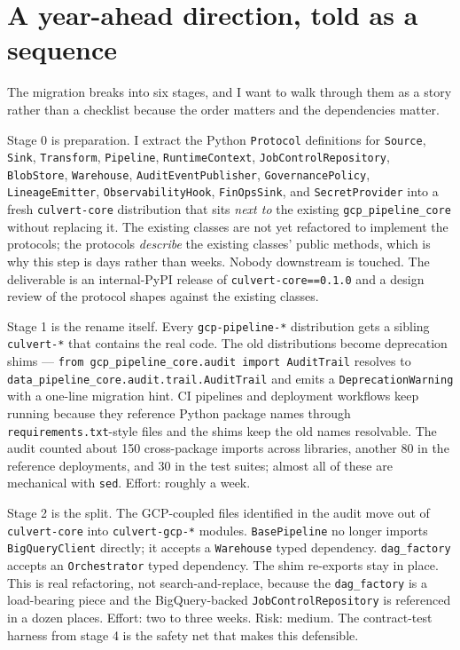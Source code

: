 \documentclass[
  11pt,
  british,
  oneside]{book}
\begin{document}
\hypertarget{a-year-ahead-direction-told-as-a-sequence}{%
\section{A year-ahead direction, told as a
sequence}\label{a-year-ahead-direction-told-as-a-sequence}}

The migration breaks into six stages, and I want to walk through them as
a story rather than a checklist because the order matters and the
dependencies matter.

Stage 0 is preparation. I extract the Python \texttt{Protocol}
definitions for \texttt{Source}, \texttt{Sink}, \texttt{Transform},
\texttt{Pipeline}, \texttt{RuntimeContext},
\texttt{JobControlRepository}, \texttt{BlobStore}, \texttt{Warehouse},
\texttt{AuditEventPublisher}, \texttt{GovernancePolicy},
\texttt{LineageEmitter}, \texttt{ObservabilityHook},
\texttt{FinOpsSink}, and \texttt{SecretProvider} into a fresh
\texttt{culvert-core} distribution that sits \emph{next to} the existing
\texttt{gcp\_pipeline\_core} without replacing it. The existing classes
are not yet refactored to implement the protocols; the protocols
\emph{describe} the existing classes' public methods, which is why this
step is days rather than weeks. Nobody downstream is touched. The
deliverable is an internal-PyPI release of \texttt{culvert-core==0.1.0}
and a design review of the protocol shapes against the existing classes.

Stage 1 is the rename itself. Every \texttt{gcp-pipeline-*} distribution
gets a sibling \texttt{culvert-*} that contains the real code. The old
distributions become deprecation shims ---
\texttt{from\ gcp\_pipeline\_core.audit\ import\ AuditTrail} resolves to
\texttt{data\_pipeline\_core.audit.trail.AuditTrail} and emits a
\texttt{DeprecationWarning} with a one-line migration hint. CI pipelines
and deployment workflows keep running because they reference Python
package names through \texttt{requirements.txt}-style files and the
shims keep the old names resolvable. The audit counted about 150
cross-package imports across libraries, another 80 in the reference
deployments, and 30 in the test suites; almost all of these are
mechanical with \texttt{sed}. Effort: roughly a week.

Stage 2 is the split. The GCP-coupled files identified in the audit move
out of \texttt{culvert-core} into \texttt{culvert-gcp-*} modules.
\texttt{BasePipeline} no longer imports \texttt{BigQueryClient}
directly; it accepts a \texttt{Warehouse} typed dependency.
\texttt{dag\_factory} accepts an \texttt{Orchestrator} typed dependency.
The shim re-exports stay in place. This is real refactoring, not
search-and-replace, because the \texttt{dag\_factory} is a load-bearing
piece and the BigQuery-backed \texttt{JobControlRepository} is
referenced in a dozen places. Effort: two to three weeks. Risk: medium.
The contract-test harness from stage 4 is the safety net that makes this
defensible.
\end{document}
